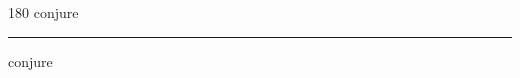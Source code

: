 
\begin{frame}
\begin{center}
\begin{turn}{180}
{\fontsize{2.5cm}{1em}\selectfont conjure}
\end{turn}
\vspace{1em}\par  
\hrule
\vspace{1em}\par  
{\fontsize{2.5cm}{1em}\selectfont conjure}
\end{center}
\end{frame}
